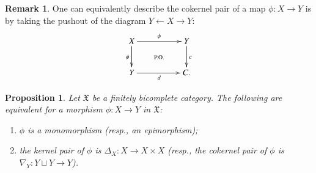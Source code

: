 \documentclass[12pt]{article}
\newtheorem{proposition}[lemma]{Proposition}
\theoremstyle{definition}
\newtheorem{remark}[lemma]{Remark}
\def\X{\mathfrak X}
\newcommand{\Set}{\textbf{\textup{Set}}}
\newcommand{\Ab}{\textbf{\textup{Ab}}}
\numberwithin{equation}{section}
\begin{document}
\begin{remark}
One can equivalently describe 
 the cokernel pair of a map $\phi\colon X\to Y$ is by taking the pushout of the diagram $Y\leftarrow X\to Y$:
\[
\xymatrix@C=50pt{
X\ar@{}[dr]|{\text{P.O.}}\ar[d]_{\phi}\ar[r]^{\phi}&Y\ar[d]^c\\
Y\ar[r]_d&C.
}
\]
\end{remark}
\fi 
\begin{proposition}\label{mono=trivial_ker_prop}
Let $\X$ be a finitely bicomplete category. The following are equivalent for a morphism $\phi\colon X\to Y$ in $\X$:
\begin{enumerate}[\rm (1)]
\item $\phi$ is a monomorphism (resp., an epimorphism);
\item the kernel pair of $\phi$ is $\Delta_X\colon X\to X\times X$ (resp., the cokernel pair of $\phi$ is $\nabla_Y\colon Y\sqcup Y\to Y$).
\end{enumerate}
\end{proposition}
\end{document}
